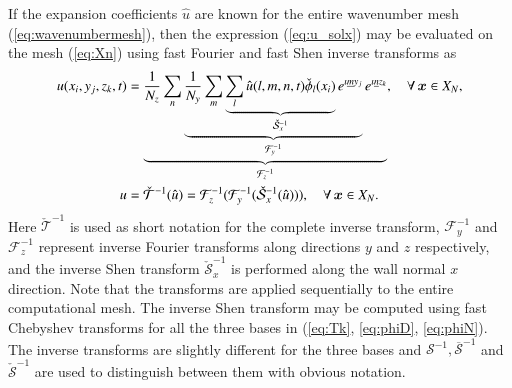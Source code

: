 \documentclass[preprint]{elsarticle}
\newcommand{\N}[1]{\check{#1}}
\newcommand{\D}[1]{\overline{#1}}
\begin{document}
If the expansion coefficients $\hat{u}$  are known for the entire wavenumber 
mesh (\ref{eq:wavenumbermesh}), then the expression (\ref{eq:u_solx}) may be 
evaluated on the mesh (\ref{eq:Xn}) using fast Fourier and fast Shen inverse 
transforms as
\begin{align}
u(x_i, y_j, z_k, t) &= \underbrace{\frac{1}{N_z}\sum_n 
\underbrace{\frac{1}{N_y} \sum_m \underbrace{\sum_l 
\hat{u}(l,m,n,t)\N{\phi}_l(x_i)}_{\N{\mathcal{S}}_x^{-1}} e^{\imath 
\underline{m} 
y_j}}_{\mathcal{F}_y^{-1}} e^{\imath \underline{n} z_k}}_{\mathcal{F}_z^{-1}} , 
\quad \forall \, \bm{x} \in X_N, \notag \\
  u &= \N{\mathcal{T}}^{-1}(\hat{u}) =  \mathcal{F}^{-1}_z (\mathcal{F}^{-1}_y 
  (\N{\mathcal{S}}^{-1}_x (\hat{u}))), \quad \forall \, \bm{x} \in X_N.  
  \label{eq:ifft} 
\end{align}
Here $\N{\mathcal{T}}^{-1}$ is used as short notation for the complete inverse 
transform, $\mathcal{F}_{y}^{-1}$ and $\mathcal{F}_{z}^{-1}$ represent inverse 
Fourier transforms along directions $y$ and $z$ respectively, and the inverse 
Shen transform $\N{\mathcal{S}}_{x}^{-1}$ is performed along the wall normal 
$x$ direction. Note that the transforms are applied sequentially to the entire 
computational mesh. The inverse Shen transform may be computed using fast 
Chebyshev transforms for all the three bases in (\ref{eq:Tk}, \ref{eq:phiD}, 
\ref{eq:phiN}). The inverse transforms are slightly different for the three 
bases and 
${\mathcal{S}}^{-1}, \D{\mathcal{S}}^{-1}$ and $\N{\mathcal{S}}^{-1}$ are used 
to distinguish between them with obvious notation. 
\end{document}
